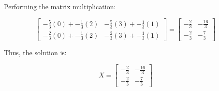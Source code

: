 \documentclass{article}
\begin{document}
Performing the matrix multiplication:

\[
\begin{bmatrix}
-\frac{5}{3}(0) + -\frac{1}{3}(2) & -\frac{5}{3}(3) + -\frac{1}{3}(1) \\
-\frac{2}{3}(0) + -\frac{1}{3}(2) & -\frac{2}{3}(3) + -\frac{1}{3}(1)
\end{bmatrix}
=
\begin{bmatrix}
-\frac{2}{3} & -\frac{16}{3} \\
-\frac{2}{3} & -\frac{7}{3}
\end{bmatrix}
\]

Thus, the solution is:

\[
X = \begin{bmatrix}
-\frac{2}{3} & -\frac{16}{3} \\
-\frac{2}{3} & -\frac{7}{3}
\end{bmatrix}
\]
\end{document}
